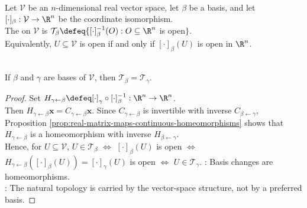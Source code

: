 \begin{definition} \label{def:natural-topology-finite-dimensional-real-vector-space} \\
Let $\mathcal{V}$ be an $n$-dimensional real vector space, let $\beta$ be a basis, and let $[\cdot]_{\beta}:\mathcal{V}\to\R^n$ be the coordinate isomorphism.\\
The  on $\mathcal{V}$ is $\mathcal{T}_{\beta} \defeq \{[\cdot]_{\beta}^{-1}(O): O\subseteq\R^n$ is open$\}$.\\
Equivalently, $U\subseteq\mathcal{V}$ is open if and only if $[\cdot]_{\beta}(U)$ is open in $\R^n$.
\end{definition}

\begin{proposition} \label{prop:natural-topology-independent-of-basis} \\
If $\beta$ and $\gamma$ are bases of $\mathcal{V}$, then $\mathcal{T}_{\beta}=\mathcal{T}_{\gamma}$.
\begin{proof}
Set $H_{\gamma\leftarrow\beta}\defeq[\cdot]_{\gamma}\circ[\cdot]_{\beta}^{-1}:\R^n\to\R^n$.\\
Then $H_{\gamma\leftarrow\beta}\mathbf{x}=C_{\gamma\leftarrow\beta}\mathbf{x}$. Since $C_{\gamma\leftarrow\beta}$ is invertible with inverse $C_{\beta\leftarrow\gamma}$, Proposition \ref{prop:real-matrix-maps-continuous-homeomorphisms} shows that $H_{\gamma\leftarrow\beta}$ is a homeomorphism with inverse $H_{\beta\leftarrow\gamma}$.\\
Hence, for $U\subseteq\mathcal{V}$, $U\in\mathcal{T}_{\beta}$ $\iff$ $[\cdot]_{\beta}(U)$ is open $\iff$ $H_{\gamma\leftarrow\beta}([\cdot]_{\beta}(U))=[\cdot]_{\gamma}(U)$ is open $\iff$ $U\in\mathcal{T}_{\gamma}$.
: Basis changes are homeomorphisms.\\
: The natural topology is carried by the vector-space structure, not by a preferred basis.
\end{proof}
\end{proposition}

